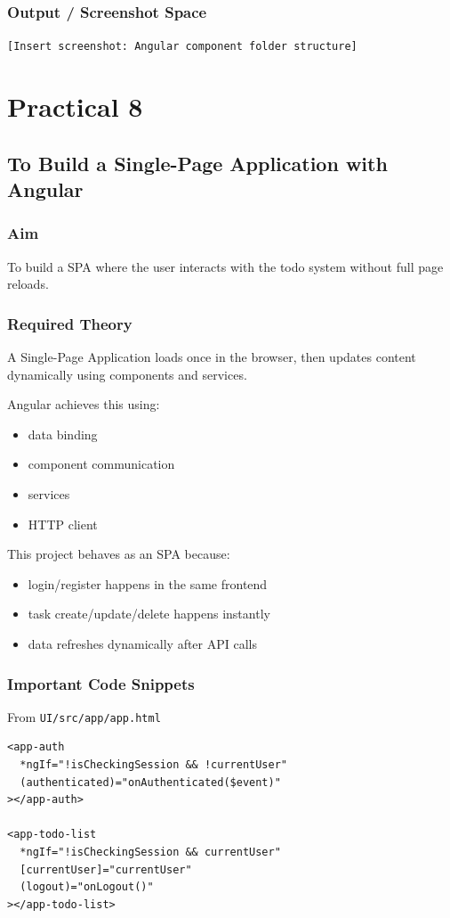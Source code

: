 \documentclass[12pt,a4paper]{article}
\begin{document}
\subsubsection*{Output / Screenshot Space}
\texttt{[Insert screenshot: Angular component folder structure]}

\section*{Practical 8}
\subsection*{To Build a Single-Page Application with Angular}

\subsubsection*{Aim}
To build a SPA where the user interacts with the todo system without full page reloads.

\subsubsection*{Required Theory}
A Single-Page Application loads once in the browser, then updates content dynamically using components and services.

Angular achieves this using:
\begin{itemize}
  \item data binding
  \item component communication
  \item services
  \item HTTP client
\end{itemize}

This project behaves as an SPA because:
\begin{itemize}
  \item login/register happens in the same frontend
  \item task create/update/delete happens instantly
  \item data refreshes dynamically after API calls
\end{itemize}

\subsubsection*{Important Code Snippets}
From \texttt{UI/src/app/app.html}
\begin{lstlisting}[style=projectcode]
<app-auth
  *ngIf="!isCheckingSession && !currentUser"
  (authenticated)="onAuthenticated($event)"
></app-auth>

<app-todo-list
  *ngIf="!isCheckingSession && currentUser"
  [currentUser]="currentUser"
  (logout)="onLogout()"
></app-todo-list>
\end{lstlisting}
\end{document}

